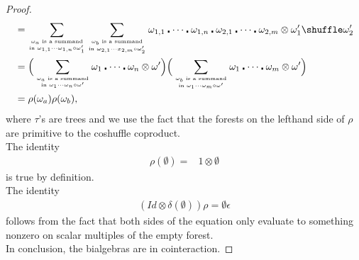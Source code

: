 \documentclass[10pt,a4paper]{article}
\begin{document}
\begin{proof}
\begin{align*}
&=
\sum_{\omega_a \text{ is a summand} \atop \text{in } \omega_{1,1} \cdots \omega_{1,n} \circ \omega_1'} 
\sum_{\omega_b \text{ is a summand} \atop \text{in } \omega_{2,1} \cdots x_{2,m} \circ \omega_2'} \omega_{1,1} \centerdot \cdots \centerdot \omega_{1,n} \centerdot \omega_{2,1} \centerdot \dots \centerdot \omega_{2,m} \otimes \omega_1' \shuffle \omega_2' \\
&=
\Big(\sum_{\omega_a \text{ is a summand} \atop \text{in } \omega_1 \cdots \omega_n \circ \omega' } \omega_1 \centerdot \cdots \centerdot \omega_n \otimes \omega' \Big)
\Big(\sum_{\omega_b \text{ is a summand} \atop  \text{in } \omega_1 \cdots \omega_m \circ \omega'} \omega_1 \centerdot \cdots \centerdot \omega_m \otimes \omega'\Big) \\
&=\rho(\omega_a) \rho(\omega_b),
\end{align*}
where $\tau$'s are trees and we use the fact that the forests on the lefthand side of $\rho$ are primitive to the coshuffle coproduct. \\

The identity
\begin{align*}
\rho(\emptyset)=&1 \otimes \emptyset
\end{align*}
is true by definition. \\
The identity
\begin{align*}
(Id \otimes \delta(\emptyset))\rho=\emptyset \epsilon
\end{align*}
follows from the fact that both sides of the equation only evaluate to something nonzero on scalar multiples of the empty forest. \\
In conclusion, the bialgebras are in cointeraction.
\end{proof}
\end{document}
